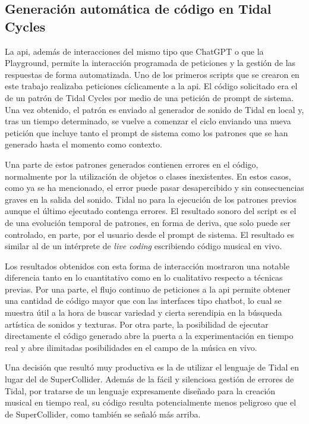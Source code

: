 \subsection{Generación automática de código en Tidal Cycles}
\label{sec:generacion_automatica_codigo_tidal_cycles}

La \gls{api}, además de interacciones del mismo tipo que ChatGPT o que la Playground, permite la interacción programada de peticiones y la gestión de las respuestas de forma automatizada. Uno de los primeros scripts que se crearon en este trabajo realizaba peticiones cíclicamente a la \gls{api}. El código solicitado era el de un patrón de Tidal Cycles por medio de una petición de prompt de sistema. Una vez obtenido, el patrón es enviado al generador de sonido de Tidal en local y, tras un tiempo determinado, se vuelve a comenzar el ciclo enviando una nueva petición que incluye tanto el prompt de sistema como los patrones que se han generado hasta el momento como contexto.

Una parte de estos patrones generados contienen errores en el código, normalmente por la utilización de objetos o clases inexistentes. En estos casos, como ya se ha mencionado, el error puede pasar desapercibido y sin consecuencias graves en la salida del sonido. Tidal no para la ejecución de los patrones previos aunque el último ejecutado contenga errores. El resultado sonoro del script es el de una evolución temporal de patrones, en forma de deriva, que solo puede ser controlado, en parte, por el usuario desde el prompt de sistema. El resultado es similar al de un intérprete de \emph{live coding} escribiendo código musical en vivo. 

Los resultados obtenidos con esta forma de interacción mostraron una notable diferencia tanto en lo cuantitativo como en lo cualitativo respecto a técnicas previas. Por una parte, el flujo continuo de peticiones a la \gls{api} permite obtener una cantidad de código mayor que con las interfaces tipo chatbot, lo cual se muestra útil a la hora de buscar variedad y cierta serendipia en la búsqueda artística de sonidos y texturas. Por otra parte, la posibilidad de ejecutar directamente el código generado abre la puerta a la experimentación en tiempo real y abre ilimitadas posibilidades en el campo de la música en vivo.

Una decisión que resultó muy productiva es la de utilizar el lenguaje de Tidal en lugar del de SuperCollider. Además de la fácil y silenciosa gestión de errores de Tidal, por tratarse de un lenguaje expresamente diseñado para la creación musical en tiempo real, su código resulta potencialmente menos peligroso que el de SuperCollider, como también se señaló más arriba. 

